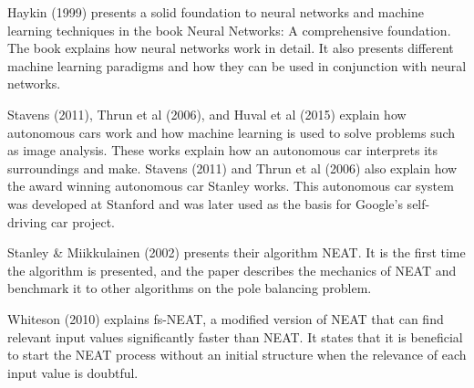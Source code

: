 Haykin (1999) presents a solid foundation to neural networks and machine learning techniques in the book Neural Networks: A comprehensive foundation.
The book explains how neural networks work in detail. It also presents different machine learning paradigms and how they can be used in conjunction with neural networks. 

Stavens (2011), Thrun et al (2006), and Huval et al (2015) explain how autonomous cars work and how machine learning is used to solve problems such as image analysis. These works explain how an autonomous car interprets its surroundings and make. Stavens (2011) and Thrun et al (2006) also explain how the award winning autonomous car Stanley works. This autonomous car system was developed at Stanford and was later used as the basis for Google's self-driving car project.

Stanley \& Miikkulainen (2002) presents their algorithm NEAT. It is the first time the algorithm is presented, and the paper describes the mechanics of NEAT and benchmark it to other algorithms on the pole balancing problem. 

Whiteson (2010) explains fs-NEAT, a modified version of NEAT that can find relevant input values significantly faster than NEAT. It states that it is beneficial to start the NEAT process without an initial structure when the relevance of each input value is doubtful.







